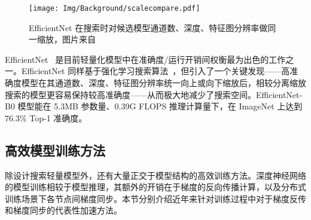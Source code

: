 \begin{figure}[htb]
  \centering
  \texttt{[image: Img/Background/scalecompare.pdf]}
  \caption{EfficientNet 在搜索时对候选模型通道数、深度、特征图分辨率做同一缩放，图片来自~\citet{tan2019efficientnet}}
  \label{img::background::efficient_net}
\end{figure}

EfficientNet~\citep{tan2019efficientnet} 是目前轻量化模型中在准确度/运行开销间权衡最为出色的工作之一。EfficientNet 同样基于强化学习搜索算法~\citep{zoph2018learning}，但引入了一个关键发现——高准确度模型在其通道数、深度、特征图分辨率统一向上或向下缩放后，相较分离缩放搜索的模型更容易保持较高准确度——从而极大地减少了搜索空间。EfficientNet-B0 模型能在 5.3MB 参数量、0.39G FLOPS 推理计算量下，在 ImageNet 上达到 $76.3\%$ Top-1 准确度。
\subsection{高效模型训练方法}
除设计搜索轻量模型外，还有大量正交于模型结构的高效训练方法。深度神经网络的模型训练相较于模型推理，其额外的开销在于梯度的反向传播计算，以及分布式训练场景下各节点间梯度同步。本节分别介绍近年来针对训练过程中对于梯度反传和梯度同步的代表性加速方法。

